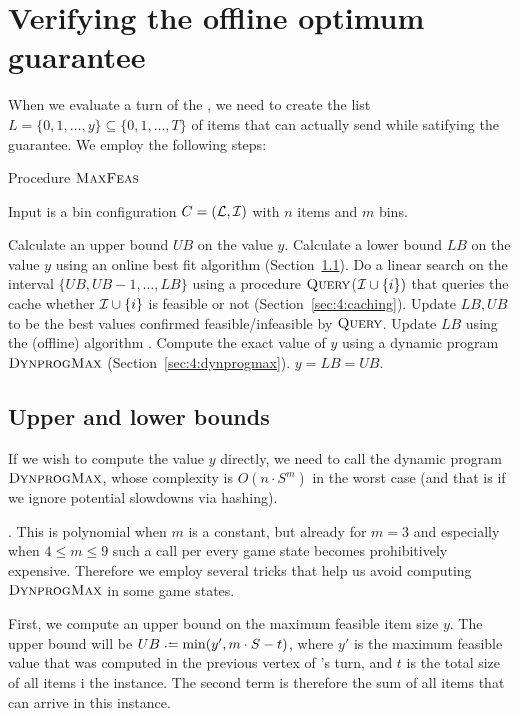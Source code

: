 \newpage
\section{Verifying the offline optimum guarantee}\label{subsec:test}

When we evaluate a turn of the \adversary, we need to create the list
$L = \{0,1,\ldots,y\} \subseteq \{0,1,\ldots,T\}$ of items that
\adversary can actually send while satifying the \binstretch
guarantee. We employ the following steps:

\begin{algorithm}
\caption{Procedure $\textsc{MaxFeas}$}
\noindent Input is a bin configuration $C = ({\mathcal L},{\mathcal I})$ with $n$ items and $m$ bins.
\begin{algorithmic}[1]
\State Calculate an upper bound $UB$ on the value $y$.
\State Calculate a lower bound $LB$ on the value $y$ using an online best fit algorithm (Section~\ref{sec:4:dynprogbounds}).
\State Do a linear search on the interval $\{UB,UB-1,\ldots,LB\}$
using a procedure $\textsc{Query}$(${\mathcal I} \cup \{i\})$ that queries the cache
whether ${\mathcal I} \cup \{i\}$ is feasible or not (Section~\ref{sec:4:caching}).
\State Update $LB, UB$ to be the best values confirmed feasible/infeasible by $\textsc{Query}$.
\EndIf
{}
\State Update $LB$ using the (offline) algorithm \bfd.
\EndIf
{}
\State Compute the exact value of $y$ using a dynamic program $\textsc{DynprogMax}$ (Section~\ref{sec:4:dynprogmax}).
\EndIf
\State \Return $y = LB = UB$.
\end{algorithmic}
\end{algorithm}

\subsection{Upper and lower bounds}\label{sec:4:dynprogbounds}

If we wish to compute the value $y$ directly, we need to call the
dynamic program $\textsc{DynprogMax}$, whose complexity is $O(n \cdot S^m)$ in
the worst case (and that is if we ignore potential slowdowns via
hashing).

. This is polynomial when $m$ is a constant, but already
for $m=3$ and especially when $4 \le m \le 9$ such a call per every
game state becomes prohibitively expensive. Therefore we employ
several tricks that help us avoid computing $\textsc{DynprogMax}$ in some game
states.

First, we compute an upper bound on the maximum feasible item size
$y$.  The upper bound will be $UB \defeq \min(y', m\cdot S - t)$, where
$y'$ is the maximum feasible value that was computed in the previous
vertex of \adversary's turn, and $t$ is the total size of all items i
the instance. The second term is therefore the sum of all items that
can arrive in this instance.

